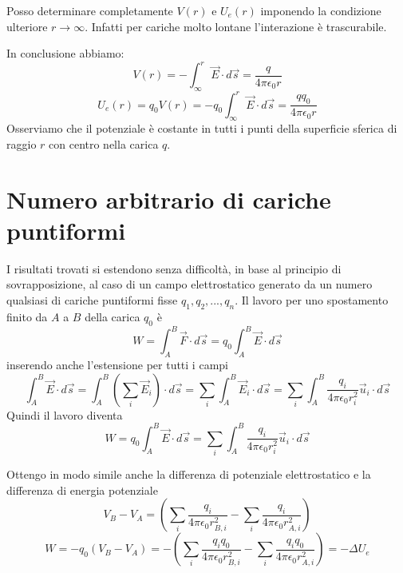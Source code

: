 \documentclass[class=book, crop=false, oneside, 12pt]{standalone}
\begin{document}
Posso determinare completamente \(V(r)\) e \(U_e(r)\) imponendo la condizione ulteriore \(r \rightarrow \infty\).  
Infatti per cariche molto lontane l'interazione è trascurabile.

In conclusione abbiamo:
\begin{equation}
    V(r) = -\int_{\infty}^r \overrightarrow{E} \cdot d \overrightarrow{s} = \frac{q}{4 \pi \epsilon_0 r}
\end{equation}
\begin{equation}
    U_e(r) = q_0 V(r) = -q_0 \int_{\infty}^r \overrightarrow{E} \cdot d \overrightarrow{s} =\frac{q q_0}{4 \pi \epsilon_0 r}
\end{equation}
Osserviamo che il potenziale è costante in tutti i punti della superficie sferica di raggio \(r\) con centro nella carica \(q\).

\section{Numero arbitrario di cariche puntiformi}

I risultati trovati si estendono senza difficoltà, in base al principio di sovrapposizione, al caso di un campo elettrostatico generato da un numero qualsiasi di cariche puntiformi fisse \(q_1, q_2, ... , q_n\). 
Il lavoro per uno spostamento finito da \(A\) a \(B\) della carica \(q_0\) è 
\begin{equation*}
    W = \int_A^B \overrightarrow{F} \cdot d \overrightarrow{s} = q_0 \int_A^B \overrightarrow{E} \cdot d \overrightarrow{s}
\end{equation*}
inserendo anche l'estensione per tutti i campi
\begin{equation*}
    \int_A^B \overrightarrow{E} \cdot d \overrightarrow{s} = \int_A^B \left(\sum_i \overrightarrow{E}_i \right) \cdot d \overrightarrow{s} = \sum_i \int_A^B \overrightarrow{E}_i \cdot d \overrightarrow{s} = \sum_i \int_A^B \frac{q_i}{4 \pi \epsilon_0 r_i^2}\overrightarrow{u}_i \cdot d \overrightarrow{s}
\end{equation*}
Quindi il lavoro diventa
\begin{equation}
    W = q_0 \int_A^B \overrightarrow{E} \cdot d \overrightarrow{s} = \sum_i \int_A^B \frac{q_i}{4 \pi \epsilon_0 r_i^2}\overrightarrow{u}_i \cdot d \overrightarrow{s}
\end{equation}

Ottengo in modo simile anche la differenza di potenziale elettrostatico e la differenza di energia potenziale
\begin{equation}
    V_B - V_A = \left(\sum_i \frac{q_i}{4 \pi \epsilon_0 r_{B,i}^2} - \sum_i \frac{q_i}{4 \pi \epsilon_0 r_{A,i}^2}\right)
\end{equation}
\begin{equation}
    W = - q_0 \left( V_B - V_A \right) = - \left(\sum_i \frac{q_i q_0}{4 \pi \epsilon_0 r_{B,i}^2} - \sum_i \frac{q_i q_0}{4 \pi \epsilon_0 r_{A,i}^2}\right) = - \Delta U_e
\end{equation}
\end{document}
